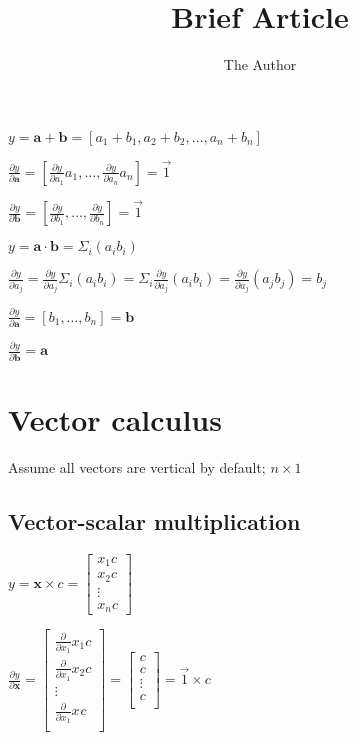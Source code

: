 \documentclass[11pt]{article}
\title{Brief Article}
\author{The Author}
\begin{document}
\maketitle

$y = \mathbf{a} + \mathbf{b} = [ a_1+b_1, a_2+b_2, \ldots, a_n+b_n ]$

$\frac{\partial y}{\partial \mathbf{a}} = [ \frac{\partial y}{\partial a_1} a_1, \ldots, \frac{\partial y}{\partial a_n} a_n] = \vec{1}$

$\frac{\partial y}{\partial \mathbf{b}} = [ \frac{\partial y}{\partial b_1}, \ldots, \frac{\partial y}{\partial b_n}] = \vec{1}$


$y = \mathbf{a} \cdot \mathbf{b} = \Sigma_i (a_i b_i)$

$\frac{\partial y}{\partial a_j} = \frac{\partial y}{\partial a_j} \Sigma_i (a_i b_i) = \Sigma_i \frac{\partial y}{\partial a_j} (a_i b_i) = \frac{\partial y}{\partial a_j} (a_j b_j) = b_j$

$\frac{\partial y}{\partial \mathbf{a}} = [ b_1, \ldots, b_n ] = \mathbf{b}$

$\frac{\partial y}{\partial \mathbf{b}} = \mathbf{a}$

\section{Vector calculus}

Assume all vectors are vertical by default; $n \times 1$

\subsection{Vector-scalar multiplication}

$y = \mathbf{x} \times c = \begin{bmatrix}
           x_{1} c\\
           x_{2} c\\
           \vdots \\
           x_{n} c
         \end{bmatrix}$

$\frac{\partial y}{\partial \mathbf{x}} =  \begin{bmatrix}
           \frac{\partial}{\partial {x_1}} x_{1} c \\
           \frac{\partial}{\partial {x_1}} x_{2} c \\
           \vdots \\
           \frac{\partial}{\partial {x_1}} x_{} c \\
         \end{bmatrix} = \begin{bmatrix}
           c\\
           c\\
           \vdots \\
           c\\
         \end{bmatrix} = \vec{1} \times c$
\end{document}
